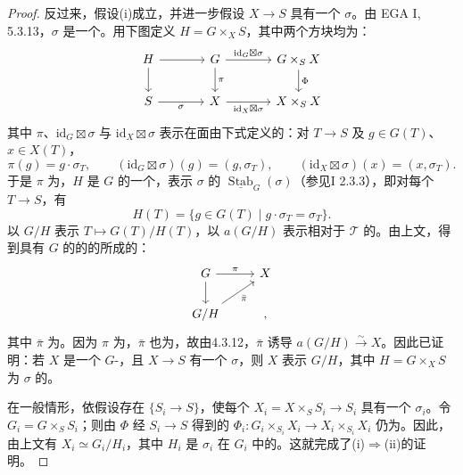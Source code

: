 \begin{proof}
反过来，假设(i)成立，并进一步假设 $X\to S$ 具有一个 $\sigma$。由 EGA I, 5.3.13，$\sigma$ 是一个。用下图定义 $H=G\times_X S$，其中两个方块均为：
\[
\begin{tikzcd}[column sep=large]
H\arrow[r]\arrow[d]&G\arrow[r,"\mathrm{id}_G\boxtimes\sigma"]\arrow[d,"\pi"]&G\times_S X\arrow[d,"\Phi"]\\
S\arrow[r,"\sigma"']&X\arrow[r,"\mathrm{id}_X\boxtimes\sigma"']&X\times_S X
\end{tikzcd}
\]
其中 $\pi$、$\mathrm{id}_G\boxtimes\sigma$ 与 $\mathrm{id}_X\boxtimes\sigma$ 表示在面由下式定义的：对 $T\to S$ 及 $g\in G(T)$、$x\in X(T)$，
\[
\pi(g)=g\cdot\sigma_T,\qquad
(\mathrm{id}_G\boxtimes\sigma)(g)=(g,\sigma_T),\qquad
(\mathrm{id}_X\boxtimes\sigma)(x)=(x,\sigma_T).
\]
于是 $\pi$ 为，$H$ 是 $G$ 的一个，表示 $\sigma$ 的 $\underline{\operatorname{Stab}}_G(\sigma)$（参见I 2.3.3），即对每个 $T\to S$，有
\[
H(T)=\{g\in G(T)\mid g\cdot\sigma_T=\sigma_T\}.
\]
以 $G/H$ 表示 $T\mapsto G(T)/H(T)$，以 $a(G/H)$ 表示相对于 $\mathcal T$ 的。由上文，得到具有 $G$ 的的的所成的：
\[
\begin{tikzcd}
G\arrow[r,"\pi"]\arrow[d]&X\\
G/H\arrow[ur,"\bar\pi"']&,
\end{tikzcd}
\]
其中 $\bar\pi$ 为。因为 $\pi$ 为，$\bar\pi$ 也为，故由4.3.12，$\bar\pi$ 诱导 $a(G/H)\xrightarrow{\sim}X$。因此已证明：若 $X$ 是一个 $G$-，且 $X\to S$ 有一个 $\sigma$，则 $X$ 表示 $G/H$，其中 $H=G\times_X S$ 为 $\sigma$ 的。

在一般情形，依假设存在 $\{S_i\to S\}$，使每个 $X_i=X\times_S S_i\to S_i$ 具有一个 $\sigma_i$。令 $G_i=G\times_S S_i$；则由 $\Phi$ 经
$S_i\to S$ 得到的 $\Phi_i:G_i\times_{S_i}X_i\to X_i\times_{S_i}X_i$ 仍为。因此，由上文有 $X_i\simeq G_i/H_i$，其中 $H_i$ 是 $\sigma_i$ 在 $G_i$ 中的。这就完成了(i)$\Rightarrow$(ii)的证明。
\end{proof}
